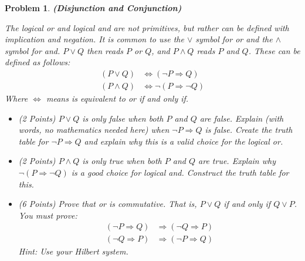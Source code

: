 \documentclass{article}
\theoremstyle{normal}
\newtheorem{problem}{Problem}
\begin{document}
    \begin{problem}
        \textbf{(Disjunction and Conjunction)}
        \par\hfill\par
        The \textit{logical or} and \textit{logical and} are not primitives,
        but rather can be defined with implication and negation.
        It is common to use the
        $\lor$ symbol for \textit{or} and the $\land$ symbol for \textit{and}.
        $P\lor{Q}$ then reads $P$ \textit{or} $Q$, and $P\land{Q}$ reads
        $P$ \textit{and} $Q$. These can be defined as follows:
        \begin{align}
            (P\lor{Q})&\Leftrightarrow(\neg{P}\Rightarrow{Q})\\
            (P\land{Q})&\Leftrightarrow\neg(P\Rightarrow\neg{Q})
        \end{align}
        Where $\Leftrightarrow$ means \textit{is equivalent to} or
        \textit{if and only if}.
        \begin{itemize}
            \item (2 Points) $P\lor{Q}$ is only false when both $P$ and $Q$ are
                false. Explain (with words, no mathematics needed here) when
                $\neg{P}\Rightarrow{Q}$ is false. Create the truth table for
                $\neg{P}\Rightarrow{Q}$ and explain why this is a valid choice
                for the logical or.
            \item (2 Points) $P\land{Q}$ is only true when both $P$ and $Q$ are
                true. Explain why $\neg(P\Rightarrow\neg{Q})$ is a good choice
                for logical and. Construct the truth table for this.
            \item (6 Points) Prove that \textit{or} is commutative. That is,
                $P\lor{Q}$ if and only if $Q\lor{P}$. You must prove:
                \begin{align}
                    (\neg{P}\Rightarrow{Q})&\Rightarrow(\neg{Q}\Rightarrow{P})\\
                    (\neg{Q}\Rightarrow{P})&\Rightarrow(\neg{P}\Rightarrow{Q})
                \end{align}
                Hint: Use your Hilbert system.
        \end{itemize}
    \end{problem}
    \color{black}
\end{document}
